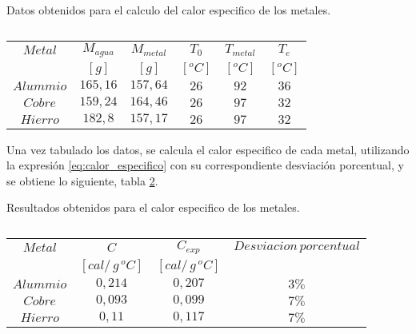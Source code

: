 \documentclass[10pt]{article}
\begin{document}
\begin{multicols*}{2}
    \begin{table}[H]
        \centering
        \caption{Datos obtenidos para el calculo del calor especifico de los metales.}
        \begin{tabular}{cccccc}
            \hline\hline
            \textbf{$Metal$} & \textbf{$M_{agua}$} & \textbf{$M_{metal}$} & \textbf{$T_0$} & \textbf{$T_{metal}$} & \textbf{$T_e$} \\
            \small           & \small $[g]$        & \small $[g]$         & \small $[^oC]$ & \small $[^oC]$       & \small $[^oC]$ \\
            \hline\hline
            $Alummio$        & $165,16$            & $157,64$             & $26$           & $92$                 & $36$           \\
            \hline
            $Cobre$          & $159,24$            & $164,46$             & $26$           & $97$                 & $32$           \\
            \hline
            $Hierro$         & $182,8$             & $157,17$             & $26$           & $97$                 & $32$           \\
            \hline
        \end{tabular}
        \caption*{}
        \label{tab:calor_especifico}
    \end{table}

    Una vez tabulado los datos, se calcula el calor especifico de cada metal,
    utilizando la expresión \ref{eq:calor_especifico} con su correspondiente
    desviación porcentual, y se obtiene lo siguiente, tabla
    \ref{tab:calor_especifico_resultados}.

    \begin{table}[H]
        \centering
        \caption{Resultados obtenidos para el calor especifico de los metales.}
        \begin{tabular}{cccc}
            \hline\hline
            \textbf{$Metal$} & \textbf{$C$}            & \textbf{$C_{exp}$}      & \textbf{$Desviacion \, porcentual$} \\
            \small           & \small $[cal/\,g\,^oC]$ & \small $[cal/\,g\,^oC]$ &                                     \\
            \hline\hline
            $Alummio$        & $0,214$                 & $0,207$                 & $3\%$                               \\
            \hline
            $Cobre$          & $0,093$                 & $0,099$                 & $7\%$                               \\
            \hline
            $Hierro$         & $0,11$                  & $0,117$                 & $7\%$                               \\
            \hline
        \end{tabular}
        \caption*{}
        \label{tab:calor_especifico_resultados}
    \end{table}


\end{multicols*}
\end{document}

